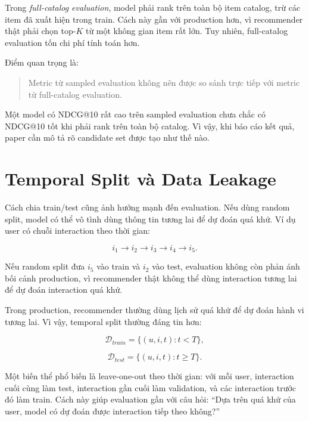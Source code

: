 \documentclass[12pt,a4paper]{article}
\begin{document}
Trong \textit{full-catalog evaluation}, model phải rank trên toàn bộ item catalog, trừ các item đã xuất hiện trong train. Cách này gần với production hơn, vì recommender thật phải chọn top-$K$ từ một không gian item rất lớn. Tuy nhiên, full-catalog evaluation tốn chi phí tính toán hơn.

Điểm quan trọng là:

\begin{quote}
Metric từ sampled evaluation không nên được so sánh trực tiếp với metric từ full-catalog evaluation.
\end{quote}

Một model có NDCG@10 rất cao trên sampled evaluation chưa chắc có NDCG@10 tốt khi phải rank trên toàn bộ catalog. Vì vậy, khi báo cáo kết quả, paper cần mô tả rõ candidate set được tạo như thế nào.

\section{Temporal Split và Data Leakage}

Cách chia train/test cũng ảnh hưởng mạnh đến evaluation. Nếu dùng random split, model có thể vô tình dùng thông tin tương lai để dự đoán quá khứ. Ví dụ user có chuỗi interaction theo thời gian:

\begin{equation}
i_1 \rightarrow i_2 \rightarrow i_3 \rightarrow i_4 \rightarrow i_5.
\end{equation}

Nếu random split đưa $i_5$ vào train và $i_2$ vào test, evaluation không còn phản ánh bối cảnh production, vì recommender thật không thể dùng interaction tương lai để dự đoán interaction quá khứ.

Trong production, recommender thường dùng lịch sử quá khứ để dự đoán hành vi tương lai. Vì vậy, temporal split thường đáng tin hơn:

\begin{equation}
\mathcal{D}_{train} = \{(u,i,t): t < T\},
\end{equation}

\begin{equation}
\mathcal{D}_{test} = \{(u,i,t): t \geq T\}.
\end{equation}

Một biến thể phổ biến là leave-one-out theo thời gian: với mỗi user, interaction cuối cùng làm test, interaction gần cuối làm validation, và các interaction trước đó làm train. Cách này giúp evaluation gần với câu hỏi: ``Dựa trên quá khứ của user, model có dự đoán được interaction tiếp theo không?''
\end{document}
